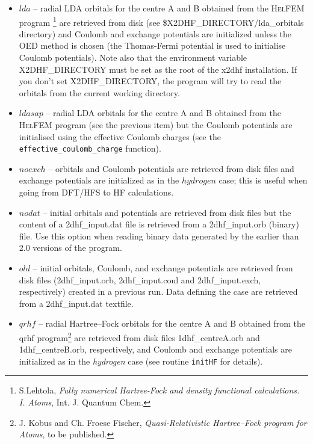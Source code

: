 \documentclass[10pt,a4paper]{article}
\newcommand{\ft}[1]{\texttt{#1}}
\begin{document}
\begin{description}
\begin{description}
\begin{itemize}
\item $lda$ -- radial LDA orbitals for the centre A and B obtained from the
  \textsc{HelFEM} program%
  \footnote{S.Lehtola, \textsl{Fully numerical Hartree-Fock and density
      functional calculations. I. Atoms}, Int. J. Quantum
    Chem. } are retrieved from disk (see
  \$X2DHF\_DI\-REC\-TO\-RY/\-lda\_orbitals directory) and Coulomb and
  exchange potentials are initialized unless the OED method is chosen (the
  Thomas-Fermi potential is used to initialise Coulomb potentials). Note
  also that the environment variable X2DHF\_DIRECTORY must be set as the
  root of the x2dhf installation. If you don't set X2DHF\_DIRECTORY, the
  program will try to read the orbitals from the current working directory.

\item $ldasap$ -- radial LDA orbitals for the centre A and B obtained from
  the \textsc{HelFEM} program (see the previous item) but the Coulomb
  potentials are initialised using the effective Coulomb charges (see the
  \ft{effective\_coulomb\_charge} function).
  
\item $noexch$ -- orbitals and Coulomb potentials are retrieved from disk
  files and exchange potentials are initialized as in the $hydrogen$ case;
  this is useful when going from DFT/HFS to HF calculations.

\item $nodat$ -- initial orbitals and potentials are retrieved from disk
  files but the content of a 2dhf\_input.dat file is retrieved from a
  2dhf\_input.orb (binary) file. Use this option when reading binary data
  generated by the earlier than 2.0 versions of the program.

\item $old$ -- initial orbitals, Coulomb, and exchange potentials are
  retrieved from disk files (2dhf\_\-input.\-orb, 2dhf\_\-input.\-coul and
  2dhf\_input.exch, respectively) created in a previous run. Data defining
  the case are retrieved from a 2dhf\_input.\-dat textfile.


\item $qrhf$ -- radial Hartree--Fock orbitals for the centre A and B
  obtained from the qrhf program\footnote{J. Kobus and Ch. Froese Fischer,
    \textsl{Quasi-Relativistic Hartree--Fock program for Atoms}, to be
    published.}  are retrieved from disk files 1dhf\-\_centreA.\-orb and
  1dhf\-\_centreB.\-orb, respectively, and Coulomb and exchange potentials
  are initialized as in the \textsl{hydrogen} case (see routine \ft{initHF}
  for details).
\end{itemize}


\end{description}
\end{description}
\end{document}

